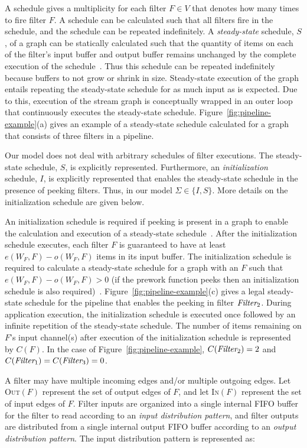 A schedule gives a multiplicity for each filter $F \in V$ that denotes
how many times to fire filter $F$. A schedule can be calculated such
that all filters fire in the schedule, and the schedule can be
repeated indefinitely.  A {\it steady-state} schedule, $S$, of a graph
can be statically calculated such that the quantity of items on each
of the filter's input buffer and output buffer remains unchanged by
the complete execution of the schedule~\cite{lee87}.  Thus this
schedule can be repeated indefinitely because buffers to not grow or
shrink in size.  Steady-state execution of the graph entails repeating
the steady-state schedule for as much input as is expected.  Due to
this, execution of the stream graph is conceptually wrapped in an
outer loop that continuously executes the steady-state schedule.
Figure~\ref{fig:pipeline-example}(a) gives an example of a
steady-state schedule calculated for a graph that consists of three
filters in a pipeline.


Our model does not deal with arbitrary schedules of filter executions.
The steady-state schedule, $S$, is explicitly represented.
Furthermore, an {\it initialization} schedule, $I$, is explicitly
represented that enables the steady-state schedule in the presence of
peeking filters.  Thus, in our model $\Sigma \in \{I, S\}$.  More details on
the initialization schedule are given below.

An initialization schedule is required if peeking is present in a
graph to enable the calculation and execution of a steady-state
schedule~\cite{karczma-thesis}.  After the initialization schedule
executes, each filter $F$ is guaranteed to have at least $e(W_F, F) -
o(W_F, F)$ items in its input buffer. The initialization schedule is
required to calculate a steady-state schedule for a graph with an $F$
such that $e(W_F, F) - o(W_F, F) > 0$ (if the prework function peeks
then an initialization schedule is also
required)~\cite{karczmarek-lctes03}.
Figure~\ref{fig:pipeline-example}(c) gives a legal steady-state
schedule for the pipeline that enables the peeking in filter
$\mbox{\it Filter}_2$.  During application execution, the initialization
schedule is executed once followed by an infinite repetition of the
steady-state schedule.   The number
of items remaining on $F$'s input channel(s) after execution of the
initialization schedule is represented by $C(F)$.  In the case of
Figure~\ref{fig:pipeline-example}, $C(\mbox{\it Filter}_2) = 2$ and
$C(\mbox{\it Filter}_1) = C(\mbox{\it Filter}_3) = 0$.

A filter may have multiple incoming edges and/or multiple outgoing
edges.  Let \textsc{Out}$(F)$ represent the set of output edges of $F$, and 
let \textsc{In}$(F)$ represent the set of input edges of $F$.
Filter inputs are organized into a single internal FIFO buffer for the
filter to read according to an {\it input distribution pattern}, and
filter outputs are distributed from a single internal output FIFO
buffer according to an {\it output distribution pattern}.   
The input distribution pattern is represented as:

